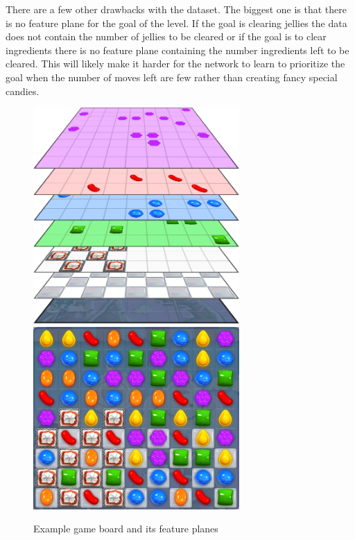 \documentclass{kththesis}
\begin{document}
There are a few other drawbacks with the dataset.  The biggest one is that there is no feature plane for the goal of the level. If the goal is clearing jellies the data does not contain the number of jellies to be cleared or if the goal is to clear ingredients there is no feature plane containing the number ingredients left to be cleared. This will likely make it harder for the network to learn to prioritize the goal when the number of moves left are few rather than creating fancy special candies. 

\begin{figure}
\centering
\includegraphics[width=0.7\textwidth]{images/game_board_feature_planes.png}
\includegraphics[width=0.7\textwidth]{images/game_board.png}

\label{fig:game_board}
\caption{Example game board and its feature planes}
\end{figure}
\end{document}
